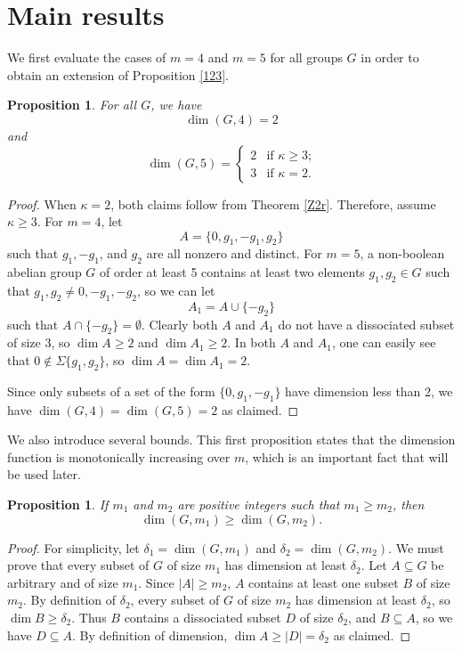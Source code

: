 \documentclass[11pt]{article}
\newtheorem{prop}[thm]{Proposition}
\begin{document}
\section{Main results}

We first evaluate the cases of $m=4$ and $m=5$ for all groups $G$ in order to obtain an extension of Proposition \ref{123}.
\begin{prop}\label{45}
For all $G$, we have
\[\dim(G,4)=2\]
and
\[\dim(G,5)=\begin{cases}
2 & \text{if $\kappa\geq3$;}\\
3 & \text{if $\kappa=2$.}
\end{cases}\]
\end{prop}
\begin{proof}
When $\kappa=2$, both claims follow from Theorem \ref{Z2r}. Therefore, assume $\kappa\geq3$. 
For $m=4$, let
\[A = \{0, g_1, -g_1, g_2\}\]
such that $g_1, -g_1$, and $g_2$ are all nonzero and distinct. For $m=5$, a non-boolean abelian group $G$ of order at least 5 contains at least two elements $g_1,g_2\in G$ such that $g_1,g_2\neq 0,-g_1,-g_2$, so we can let
\[A_1= A\cup\{-g_2\}\]
such that $A\cap\{-g_2\}=\emptyset$. Clearly both $A$ and $A_1$ do not have a dissociated subset of size 3, so $\dim A\geq 2$ and $\dim A_1\geq 2$. In both $A$ and $A_1$, one can easily see that $0\notin\Sigma\{g_1,g_2\}$, so $\dim A =\dim A_1=2$. 

Since only subsets of a set of the form $\{0,g_1,-g_1\}$ have dimension less than 2, we have $\dim(G,4)=\dim(G,5)=2$ as claimed.
\end{proof}

We also introduce several bounds. This first proposition states that the dimension function is monotonically increasing over $m$, which is an important fact that will be used later.

\begin{prop}\label{m1m2}
If $m_1$ and $m_2$ are positive integers such that $m_1\geq m_2$, then
\[\dim(G,m_1)\geq\dim(G,m_2).\]
\end{prop}
\begin{proof}
For simplicity, let $\delta_1=\dim(G, m_1)$ and $\delta_2=\dim(G, m_2)$. We must prove that every subset of $G$ of size $m_1$ has dimension at least $\delta_2$. Let $A\subseteq G$ be arbitrary and of size $m_1$.
Since $|A|\geq m_2$, $A$ contains at least one subset $B$ of size $m_2$. By definition of $\delta_2$, every subset of $G$ of size $m_2$ has dimension at least $\delta_2$, so $\dim B\geq \delta_2$. Thus $B$ contains a dissociated subset $D$ of size $\delta_2$, and $B\subseteq A$, so we have $D\subseteq A$. By definition of dimension, $\dim A\geq |D|=\delta_2$ as claimed.
\end{proof}
\end{document}
